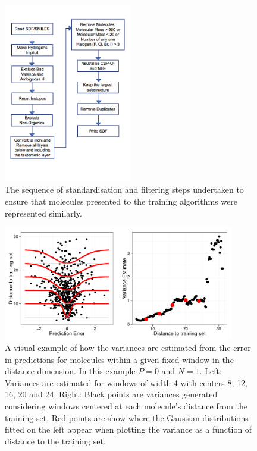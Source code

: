 \documentclass[10pt]{bmc_article}
\newenvironment{bmcformat}{\begin{raggedright}\baselineskip20pt\sloppy\setboolean{publ}{false}}{\end{raggedright}\baselineskip20pt\sloppy}
\begin{document}
\begin{bmcformat}
\begin{figure}[ht]
  \centering
  \includegraphics[width=0.5\textwidth]{./Figures/standardisation_workflow.png}
  \caption{The sequence of standardisation and filtering steps undertaken to ensure that molecules presented to the training algorithms were represented similarly.}
  \label{fig:standardisation_workflow}  
\end{figure}

\begin{figure}[ht]
  \centering
  \includegraphics[width=0.9\textwidth]{./Figures/methods_error_estimation.pdf}
  \caption{A visual example of how the variances are estimated from the error in predictions for molecules within a given fixed window in the distance dimension. In this example $P=0$ and $N=1$. Left: Variances are estimated for windows of width 4 with centers 8, 12, 16, 20 and 24. Right: Black points are variances generated considering windows centered at each molecule's distance from the training set. Red points are show where the Gaussian distributions fitted on the left appear when plotting the variance as a function of distance to the training set.}
  \label{fig:methods_error_estimation}
\end{figure} 


\end{bmcformat}
\end{document}
